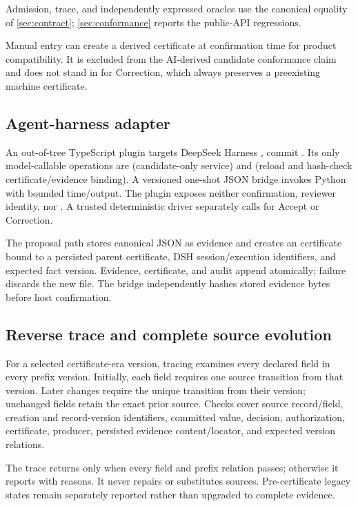 Admission, trace, and independently expressed oracles use the canonical equality of \cref{sec:contract}; \cref{sec:conformance} reports the public-API regressions.

Manual entry can create a derived certificate at confirmation time for product compatibility. It is excluded from the AI-derived candidate conformance claim and does not stand in for Correction, which always preserves a preexisting machine certificate.

\subsection{Agent-harness adapter}

An out-of-tree TypeScript plugin targets DeepSeek Harness , commit . Its only model-callable operations are  (candidate-only service) and  (reload and hash-check certificate/evidence binding). A versioned one-shot JSON bridge invokes Python with bounded time/output. The plugin exposes neither confirmation, reviewer identity, nor . A trusted deterministic driver separately calls  for Accept or Correction.

The proposal path stores canonical JSON as  evidence and creates an  certificate bound to a persisted parent certificate, DSH session/execution identifiers, and expected fact version. Evidence, certificate, and audit append atomically; failure discards the new file. The bridge independently hashes stored evidence bytes before host confirmation.

\subsection{Reverse trace and complete source evolution}

For a selected certificate-era version, tracing examines every declared field in every prefix version. Initially, each field requires one source transition from that version. Later changes require the unique transition from their version; unchanged fields retain the exact prior source. Checks cover source record/field, creation and record-version identifiers, committed value, decision, authorization, certificate, producer, persisted evidence content/locator, and expected version relations.

The trace returns  only when every field and prefix relation passes; otherwise it reports  with reasons. It never repairs or substitutes sources. Pre-certificate legacy states remain separately reported rather than upgraded to complete evidence.